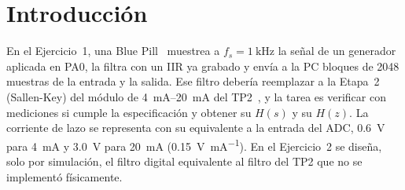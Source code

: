 \section{Introducción}

En el Ejercicio~1, una Blue Pill~\cite{ds} muestrea a $f_s = \SI{1}{\kilo\hertz}$ la señal de un generador aplicada en PA0, la filtra con un IIR ya grabado y envía a la PC bloques de 2048 muestras de la entrada y la salida. Ese filtro debería reemplazar a la Etapa~2 (Sallen-Key) del módulo de \SIrange{4}{20}{\milli\ampere} del TP2~\cite{tp2}, y la tarea es verificar con mediciones si cumple la especificación y obtener su $H(s)$ y su $H(z)$. La corriente de lazo se representa con su equivalente a la entrada del ADC, \SI{0,6}{\volt} para \SI{4}{\milli\ampere} y \SI{3,0}{\volt} para \SI{20}{\milli\ampere} (\SI{0,15}{\volt\per\milli\ampere}). En el Ejercicio~2 se diseña, solo por simulación, el filtro digital equivalente al filtro del TP2 que no se implementó físicamente.
